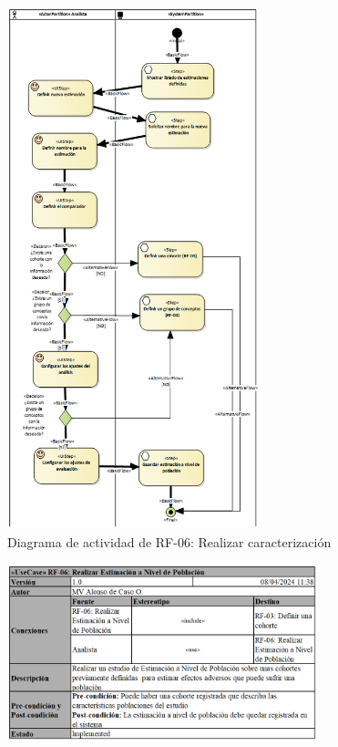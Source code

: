 \begin{figure}[H]
    \centering
    \includegraphics[width=0.65\textwidth]{figures/FR06.png}
    \caption{Diagrama de actividad de RF-06: Realizar caracterización}
    \label{fig:FR06}
\end{figure}

\begin{figure}[H]
    \centering
    \includegraphics[width=0.80\textwidth]{tables/RF06tab.png}
    \label{table:RF06tab}
\end{figure}

